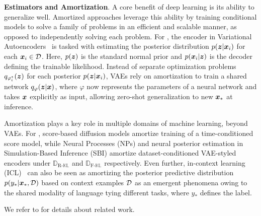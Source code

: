 
\textbf{Estimators and Amortization}. A core benefit of deep learning is its ability to generalize well. Amortized approaches leverage this ability by training conditional models to solve a family of problems in an efficient and scalable manner, as opposed to independently solving each problem. For \eg, the encoder in Variational Autoencoders~\citep[VAEs;][]{kingma2013auto,rezende2014stochastic} is tasked with estimating the posterior distribution $p({\bm{z}} | {\bm{x}}_i)$ for each ${\bm{x}}_i \in {\mathcal{D}}$. Here, $p({\bm{z}})$ is the standard normal prior and $p({\bm{x}}_i | {\bm{z}})$ is the decoder defining the trainable likelihood. Instead of separate optimization problems $q_{\varphi_i^*}({\bm{z}})$ for each posterior $p({\bm{z}} | {\bm{x}}_i)$, VAEs rely on amortization to train a shared network $q_\varphi({\bm{z}} | {\bm{x}})$, where $\varphi$ now represents the parameters of a neural network and takes ${\bm{x}}$ explicitly as input, allowing zero-shot generalization to new ${\bm{x}}_*$ at inference. 

Amortization plays a key role in multiple domains of machine learning, beyond VAEs. For \eg, score-based diffusion models \citep{song2020score} amortize training of a time-conditioned score model, while Neural Processes (NPs) \citep{garnelo2018conditional,garnelo2018neural} and neural posterior estimation in Simulation-Based Inference (SBI) \citep{cranmer2020sbireview} amortize dataset-conditioned VAE-styled encoders under $\mathbb{D}_{\text{R-}\mathbb{KL}}$ and $\mathbb{D}_{\text{F-}\mathbb{KL}}$ respectively. Even further, in-context learning (ICL)~\citep{von2023transformers,muller2021transformers} can also be seen as amortizing the posterior predictive distribution $p(y_* | {\bm{x}}_*, {\mathcal{D}})$ based on context examples ${\mathcal{D}}$ as an emergent phenomena owing to the shared modality of language tying different tasks, where $y_*$ defines the label.


We refer to  for details about related work.
